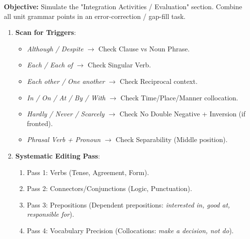 \documentclass[11pt]{article}
\begin{document}
\begin{methode}
    \textbf{Objective:} Simulate the "Integration Activities / Evaluation" section. Combine all unit grammar points in an error-correction / gap-fill task.
    \begin{enumerate}
        \item \textbf{Scan for Triggers}:
              \begin{itemize}
                  \item \emph{Although / Despite} $\to$ Check Clause vs Noun Phrase.
                  \item \emph{Each / Each of} $\to$ Check Singular Verb.
                  \item \emph{Each other / One another} $\to$ Check Reciprocal context.
                  \item \emph{In / On / At / By / With} $\to$ Check Time/Place/Manner collocation.
                  \item \emph{Hardly / Never / Scarcely} $\to$ Check No Double Negative + Inversion (if fronted).
                  \item \emph{Phrasal Verb + Pronoun} $\to$ Check Separability (Middle position).
              \end{itemize}
        \item \textbf{Systematic Editing Pass}:
              \begin{enumerate}
                  \item Pass 1: Verbs (Tense, Agreement, Form).
                  \item Pass 2: Connectors/Conjunctions (Logic, Punctuation).
                  \item Pass 3: Prepositions (Dependent prepositions: \emph{interested in, good at, responsible for}).
                  \item Pass 4: Vocabulary Precision (Collocations: \emph{make a decision, not do}).
              \end{enumerate}
    \end{enumerate}
\end{methode}
\end{document}
